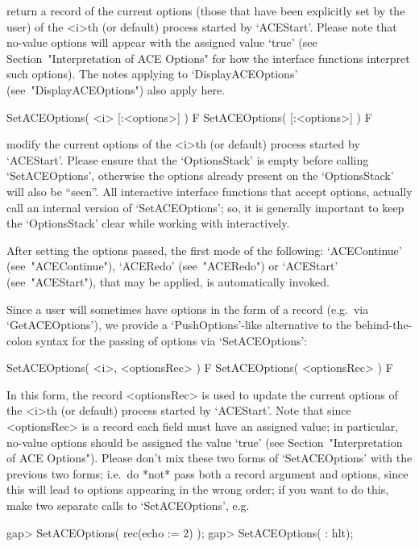 return  a  record  of  the  current  options  (those  that  have  been
explicitly set by the user) of the <i>th (or default) process  started
by `ACEStart'. Please note that no-value {\ACE}  options  will  appear
with the assigned value `true'  (see  Section~"Interpretation  of  ACE
Options"  for  how  the  {\ACE}  interface  functions  interpret  such
options).    The     notes     applying     to     `DisplayACEOptions'
(see~"DisplayACEOptions") also apply here.

\>SetACEOptions( <i> [:<options>] ) F
\>SetACEOptions( [:<options>] ) F

modify the current options of the <i>th (or default)  process  started
by `ACEStart'. Please ensure that the `OptionsStack' is  empty  before
calling `SetACEOptions', otherwise the options already present on  the
`OptionsStack' will also be ``seen''. All interactive {\ACE} interface
functions that accept options, actually call an  internal  version  of
`SetACEOptions';  so,  it  is  generally   important   to   keep   the
`OptionsStack' clear while working with {\ACE} interactively.

After setting the options passed, the first  mode  of  the  following:
`ACEContinue'  (see~"ACEContinue"),   `ACERedo'   (see~"ACERedo")   or
`ACEStart' (see~"ACEStart"), that may  be  applied,  is  automatically
invoked.

Since a user will sometimes have options  in  the  form  of  a  record
(e.g.~via   `GetACEOptions'),   we   provide   a    `PushOptions'-like
alternative to the behind-the-colon syntax for the passing of  options
via `SetACEOptions':

\>SetACEOptions( <i>, <optionsRec> ) F
\>SetACEOptions( <optionsRec> ) F

In this form, the record <optionsRec> is used to  update  the  current
options of the <i>th (or default) process started by `ACEStart'.  Note
that since <optionsRec> is a record each field must have  an  assigned
value; in particular, no-value {\ACE} options should be  assigned  the
value `true' (see Section~"Interpretation  of  ACE  Options").  Please
don't mix these two forms of `SetACEOptions'  with  the  previous  two
forms; i.e.~do *not* pass both a record argument  and  options,  since
this will lead to options appearing in the wrong order; if you want to
do this, make two separate calls to `SetACEOptions', e.g.

\beginexample
gap> SetACEOptions( rec(echo := 2) );
gap> SetACEOptions( : hlt);
\endexample

